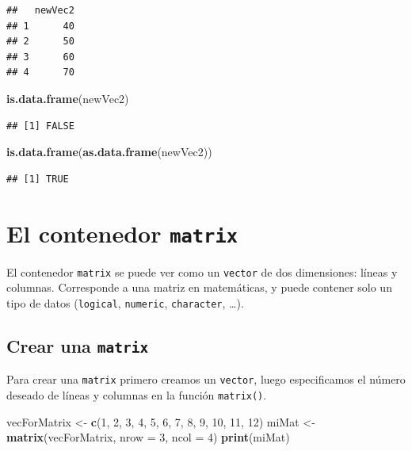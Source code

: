 \documentclass[]{book}
\newenvironment{Shaded}{\begin{snugshade}}{\end{snugshade}}
\newcommand{\KeywordTok}[1]{\textcolor[rgb]{0.13,0.29,0.53}{\textbf{#1}}}
\newcommand{\DataTypeTok}[1]{\textcolor[rgb]{0.13,0.29,0.53}{#1}}
\newcommand{\DecValTok}[1]{\textcolor[rgb]{0.00,0.00,0.81}{#1}}
\newcommand{\StringTok}[1]{\textcolor[rgb]{0.31,0.60,0.02}{#1}}
\newcommand{\NormalTok}[1]{#1}
\begin{document}
\begin{verbatim}
##   newVec2
## 1      40
## 2      50
## 3      60
## 4      70
\end{verbatim}

\begin{Shaded}
\begin{Highlighting}[]
\KeywordTok{is.data.frame}\NormalTok{(newVec2)}
\end{Highlighting}
\end{Shaded}

\begin{verbatim}
## [1] FALSE
\end{verbatim}

\begin{Shaded}
\begin{Highlighting}[]
\KeywordTok{is.data.frame}\NormalTok{(}\KeywordTok{as.data.frame}\NormalTok{(newVec2))}
\end{Highlighting}
\end{Shaded}

\begin{verbatim}
## [1] TRUE
\end{verbatim}

\section{\texorpdfstring{El contenedor
\texttt{matrix}}{El contenedor matrix}}\label{el-contenedor-matrix}

El contenedor \texttt{matrix} se puede ver como un \texttt{vector} de
dos dimensiones: líneas y columnas. Corresponde a una matriz en
matemáticas, y puede contener solo un tipo de datos (\texttt{logical},
\texttt{numeric}, \texttt{character}, \ldots{}).

\subsection{\texorpdfstring{Crear una
\texttt{matrix}}{Crear una matrix}}\label{crear-una-matrix}

Para crear una \texttt{matrix} primero creamos un \texttt{vector}, luego
especificamos el número deseado de líneas y columnas en la función
\texttt{matrix()}.

\begin{Shaded}
\begin{Highlighting}[]
\NormalTok{vecForMatrix <-}\StringTok{ }\KeywordTok{c}\NormalTok{(}\DecValTok{1}\NormalTok{, }\DecValTok{2}\NormalTok{, }\DecValTok{3}\NormalTok{, }\DecValTok{4}\NormalTok{, }\DecValTok{5}\NormalTok{, }\DecValTok{6}\NormalTok{, }\DecValTok{7}\NormalTok{, }\DecValTok{8}\NormalTok{, }\DecValTok{9}\NormalTok{, }\DecValTok{10}\NormalTok{, }\DecValTok{11}\NormalTok{, }\DecValTok{12}\NormalTok{)}
\NormalTok{miMat <-}\StringTok{ }\KeywordTok{matrix}\NormalTok{(vecForMatrix, }\DataTypeTok{nrow =} \DecValTok{3}\NormalTok{, }\DataTypeTok{ncol =} \DecValTok{4}\NormalTok{)}
\KeywordTok{print}\NormalTok{(miMat)}
\end{Highlighting}
\end{Shaded}
\end{document}
